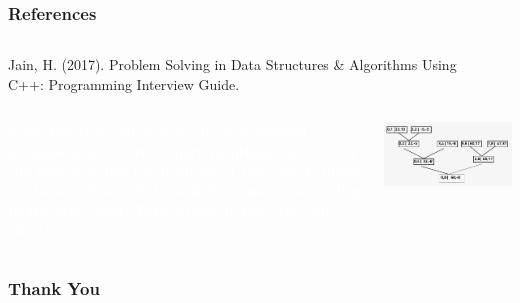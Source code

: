\documentclass[aspectratio=169, table]{beamer}
\begin{document}
\begin{frame2}
	\frametitle{References}
	\begin{tcolorbox}[standard jigsaw, opacityback=0, opacityframe=0, sharp corners, boxrule=0pt]
		\begin{columns}[T] %
			\begin{column}{0.7\textwidth}
				Jain, H. (2017). Problem Solving in Data Structures \& Algorithms Using C++: Programming Interview Guide.
				
			\end{column}
			\begin{column}{0.3\textwidth}
				
			\end{column}
		\end{columns}
	\end{tcolorbox}
\end{frame2}

\begin{frame3}
	\vskip1cm
	\begin{tcolorbox}[standard jigsaw, opacityback=0, opacityframe=0, sharp corners, boxrule=0pt]
		\begin{columns}[T] %
			\begin{column}{0.5\textwidth}
				\textbf{\textcolor{white}{Then the tree call process dr each element designated in the tree chart mentioned above. By the way, first flip the position of the tree dr down to the top. 
					Then fill it with its elements according to the tree chart. Take a look at this tree call chart:}}
			\end{column}
			\begin{column}{0.5\textwidth}
				\includegraphics[width=1.2\textwidth]{classFiles/chart.png}
			\end{column}
		\end{columns}
	\end{tcolorbox}
\end{frame3}
	
\begin{frame4}
	\frametitle{Thank You}
\end{frame4}
	
\end{document}

